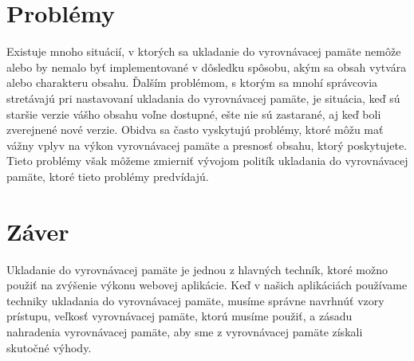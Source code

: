 \documentclass[10pt,oneside,slovak,a4paper]{article}
\begin{document}
\section{Problémy}
\quad
Existuje mnoho situácií, v ktorých sa ukladanie do vyrovnávacej pamäte nemôže alebo by nemalo byť implementované v dôsledku spôsobu, akým sa obsah vytvára  alebo charakteru obsahu. Ďalším problémom, s ktorým sa mnohí správcovia stretávajú pri nastavovaní ukladania do vyrovnávacej pamäte, je situácia, keď sú staršie verzie vášho obsahu voľne dostupné, ešte nie sú zastarané, aj keď boli zverejnené nové verzie. Obidva sa často vyskytujú problémy, ktoré môžu mať vážny vplyv na výkon vyrovnávacej pamäte a presnosť obsahu, ktorý poskytujete. Tieto problémy však môžeme zmierniť vývojom politík ukladania do vyrovnávacej pamäte, ktoré tieto problémy predvídajú.











\section{Záver}
\quad
Ukladanie do vyrovnávacej pamäte je jednou z hlavných techník, ktoré možno použiť na zvýšenie výkonu webovej aplikácie. Keď v našich aplikáciách používame techniky ukladania do vyrovnávacej pamäte, musíme správne navrhnúť vzory prístupu, veľkosť vyrovnávacej pamäte, ktorú musíme použiť, a zásadu nahradenia vyrovnávacej pamäte, aby sme z vyrovnávacej pamäte získali skutočné výhody.



\end{document}
